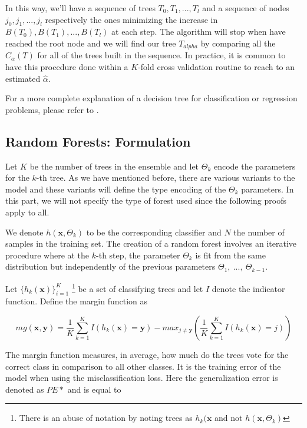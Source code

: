 In this way, we'll have a sequence of trees $T_0,T_1,...,T_l$ and a sequence of nodes $j_0, j_1,...,j_l$ respectively the ones minimizing the increase in $B(T_0),B(T_1),...,B(T_l)$ at each step. The algorithm will stop when have reached the root node and we will find our tree $T_{alpha}$ by comparing all the $C_\alpha(T)$ for all of the trees built in the sequence. In practice, it is common to have this procedure done within a $K$-fold cross validation routine to reach to an estimated $\hat{\alpha}$.

For a more complete explanation of a decision tree for classification or regression problems, please refer to \textcite{breiman-cart84}.

\textit{}

\subsection{ Random Forests: Formulation }


Let $K$  be the number of trees in the ensemble and let $\Theta_k$ encode the parameters for the $k$-th tree. As we have mentioned before, there are various variants to the model and these variants will define the type encoding of the $\Theta_k$ parameters. In this part, we will not specify the type of forest used since the following proofs apply to all.

We denote $h(\textbf{x},\Theta_k)$ to be the corresponding classifier and $N$ the number of samples in the training set. The creation of a random forest involves an iterative procedure where at the $k$-th step, the parameter $\Theta_k$ is fit from the same distribution but independently of the previous parameters $\Theta_1, \ ..., \ \Theta_{k-1}$. %


Let $\{h_k(\textbf{x})\}_{i=1}^K$  \footnote{There is an abuse of notation by noting trees as $h_k(\textbf{x}$ and not $h(\textbf{x}, \Theta_k)$ } be a set of classifying trees and let $I$ denote the indicator function.  Define the margin function as

\begin{equation}
mg(\textbf{x},\textbf{y}) =  \frac{1}{K}   \sum_{k=1}^K I(h_k(\textbf{x}) = \textbf{y})
- max_{j\neq \textbf{y}}\left(\frac{1}{K} \sum_{k=1}^K I(h_k(\textbf{x}) = j) \right) 
\end{equation} \label{eq:rf-marginFun}

The margin function measures, in average, how much do the trees vote for the correct class in comparison to all other classes. It is the training error of the model when using the misclassification loss. Here the generalization error is denoted as $PE*$ and is equal to  


